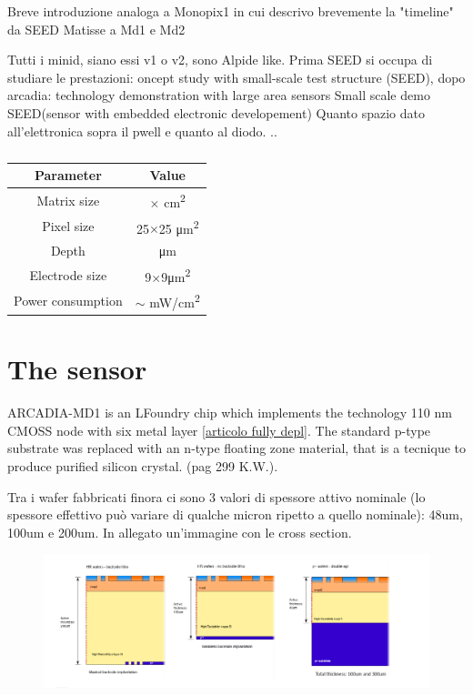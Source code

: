 \cite{ARCADIA-Pancheri}
\cite{ARCADIA-Pancheri2}

Breve introduzione analoga a Monopix1 in cui descrivo brevemente la "timeline" da SEED Matisse a Md1 e Md2

Tutti i minid, siano essi v1 o v2, sono Alpide like.
Prima SEED si occupa di studiare le prestazioni: oncept study with small-scale test structure (SEED),
dopo arcadia: technology demonstration with large area sensors
Small scale demo SEED(sensor with embedded electronic developement)
Quanto spazio dato all'elettronica sopra il pwell e quanto al diodo. ..

\begin{table}
    \begin{center}
    \begin{tabular}{| c |c |}
    \hline
    Parameter & Value\\
    \hline
    \hline
    Matrix size &  $\times$ \si{cm\squared}\\
    Pixel size & 25$\times$25 \si{\um\squared}\\
    Depth &  \red{?}\si{\um}\\
    Electrode size & 9$\times$9\si{\um\squared}\\
    Power consumption & $\sim$  \si{mW/cm\squared}\\    
    \hline
    \end{tabular}
    \caption{}
    \label{tab:ARCADIA_MD1}
    \end{center}
\end{table}

\section{The sensor}
    ARCADIA-MD1 is an LFoundry chip which implements the technology 110 nm CMOSS node with six metal layer \ref{articolo fully depl}.
    The standard p-type substrate was replaced with an n-type floating zone material, that is a tecnique to produce purified silicon crystal. (pag 299 K.W.).

    Tra i wafer fabbricati finora ci sono 3 valori di spessore attivo nominale (lo spessore effettivo può variare 
    di qualche micron ripetto a quello nominale):  48um, 100um e 200um. In allegato un'immagine
    con le cross section.
    \begin{figure}[h!]
        \centering
        \includegraphics[width=.8\linewidth]{figures/ARCADIA/ARCADIA_substrate.png}
        \caption{}
        \label{fig:ARCADIA_substrate}
    \end{figure}

